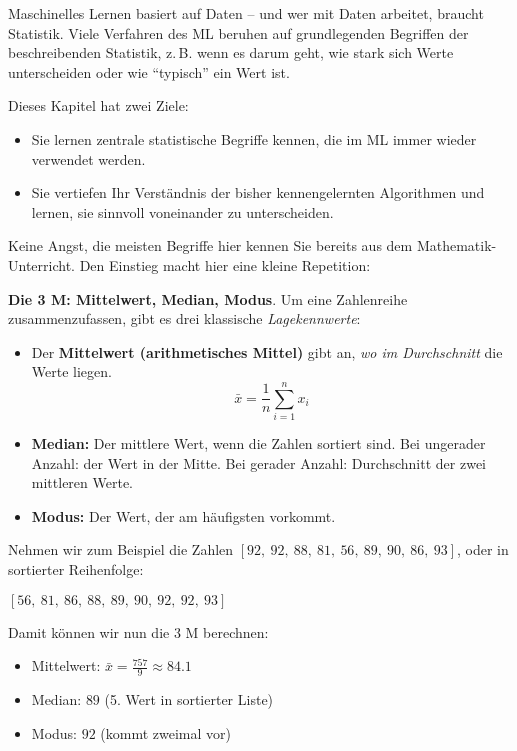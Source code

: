\begin{lpu}
Maschinelles Lernen basiert auf Daten – und wer mit Daten arbeitet, braucht Statistik. Viele Verfahren des ML beruhen auf grundlegenden Begriffen der beschreibenden Statistik, z.\,B. wenn es darum geht, wie stark sich Werte unterscheiden oder wie ``typisch'' ein Wert ist.

Dieses Kapitel hat zwei Ziele:
\begin{itemize}
  \item Sie lernen zentrale statistische Begriffe kennen, die im ML immer wieder verwendet werden.
  \item Sie vertiefen Ihr Verständnis der bisher kennengelernten Algorithmen und lernen, sie sinnvoll voneinander zu unterscheiden.
\end{itemize}

Keine Angst, die meisten Begriffe hier kennen Sie bereits aus dem Mathematik-Unterricht. Den Einstieg macht hier eine kleine Repetition:

\begin{theorie}
\textbf{Die 3 M: Mittelwert, Median, Modus}. Um eine Zahlenreihe zusammenzufassen, gibt es drei klassische \textit{Lagekennwerte}:

\begin{itemize}
  \item Der \textbf{Mittelwert (arithmetisches Mittel)} gibt an, \emph{wo im Durchschnitt} die Werte liegen.
    \[
    \bar{x} = \frac{1}{n} \sum_{i=1}^{n} x_i
    \]

  \item \textbf{Median:} Der mittlere Wert, wenn die Zahlen sortiert sind. Bei ungerader Anzahl: der Wert in der Mitte. Bei gerader Anzahl: Durchschnitt der zwei mittleren Werte.

  \item \textbf{Modus:} Der Wert, der am häufigsten vorkommt.
\end{itemize}
\end{theorie}

Nehmen wir zum Beispiel die Zahlen $[92,\ 92,\ 88,\ 81,\ 56,\ 89,\ 90,\ 86,\ 93]$, oder in sortierter Reihenfolge:

\begin{center}
$[56,\ 81,\ 86,\ 88,\ 89,\ 90,\ 92,\ 92,\ 93]$
\end{center}

Damit können wir nun die 3 M berechnen:
\begin{itemize}
  \item Mittelwert: $\bar{x} = \frac{757}{9} \approx 84.1$
  \item Median: $89$ (5. Wert in sortierter Liste)
  \item Modus: $92$ (kommt zweimal vor)
\end{itemize}


\end{lpu}
